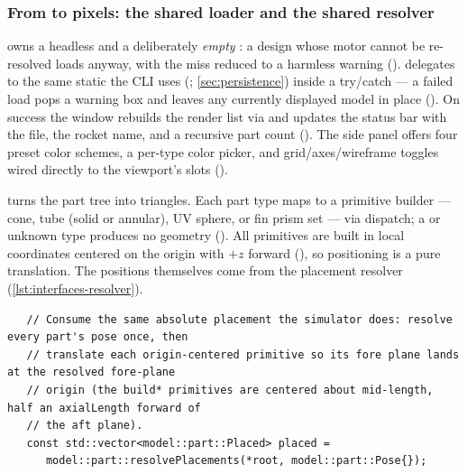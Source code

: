 \subsubsection{From  to pixels: the shared loader and the shared resolver}
\label{sec:interfaces-viz-mesh}

 owns a headless  and a deliberately
\emph{empty} : a design whose motor cannot be re-resolved loads
anyway, with the miss reduced to a harmless warning
().  delegates to the same static
 the CLI uses (;
\cref{sec:persistence}) inside a try/catch --- a failed load pops a warning box and leaves
any currently displayed model in place (). On success
the window rebuilds the render list via  and updates the status
bar with the file, the rocket name, and a recursive part count
(). The side panel offers four preset color
schemes, a per-type color picker, and grid/axes/wireframe toggles wired directly to the
viewport's slots ().

 turns the part tree into triangles. Each part type maps to a primitive
builder --- cone, tube (solid or annular), UV sphere, or fin prism set --- via
 dispatch; a  or unknown type produces no geometry
(). All primitives are built in local coordinates
centered on the origin with $+z$ forward (), so positioning
is a pure translation. The positions themselves come from the placement resolver
(\cref{lst:interfaces-resolver}).

\begin{listing}[htbp]
\begin{verbatim}
   // Consume the same absolute placement the simulator does: resolve every part's pose once, then
   // translate each origin-centered primitive so its fore plane lands at the resolved fore-plane
   // origin (the build* primitives are centered about mid-length, half an axialLength forward of
   // the aft plane).
   const std::vector<model::part::Placed> placed =
      model::part::resolvePlacements(*root, model::part::Pose{});
\end{verbatim}
\caption{The visualizer asks the model layer's resolver --- not its own arithmetic --- where
every part is. The comment names the contract. }
\label{lst:interfaces-resolver}
\end{listing}

